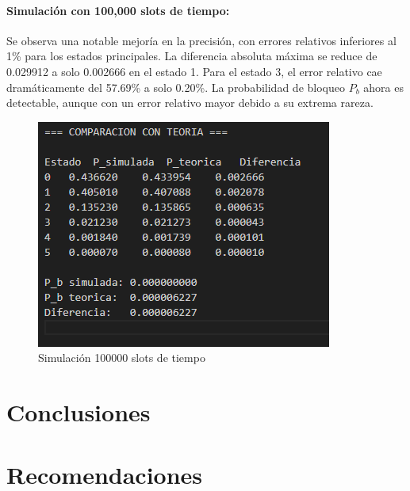 \documentclass{article}
\begin{document}
\paragraph{Simulación con 100,000 slots de tiempo:}
Se observa una notable mejoría en la precisión, con errores relativos inferiores al 1\% para los estados principales. La diferencia absoluta máxima se reduce de 0.029912 a solo 0.002666 en el estado 1. Para el estado 3, el error relativo cae dramáticamente del 57.69\% a solo 0.20\%. La probabilidad de bloqueo $P_b$ ahora es detectable, aunque con un error relativo mayor debido a su extrema rareza.

\begin{figure}[H]
    \centering
    \includegraphics[width=0.75\linewidth]{images/imageGeoGeoMCalc11.png}
    \caption{Simulación 100000 slots de tiempo}
    \label{fig:enter-label}
\end{figure}


\section{Conclusiones}\label{sec:concl}



\section{Recomendaciones}\label{secrecomen}
\end{document}
